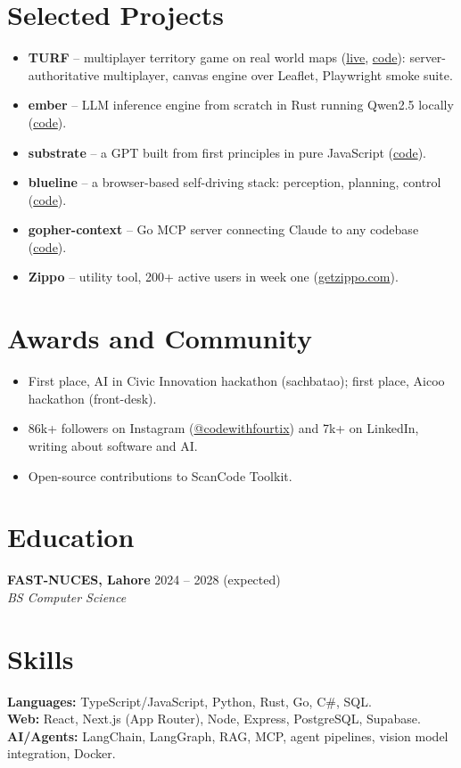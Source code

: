 \documentclass[10pt]{article}
\newcommand{\entry}[4]{\noindent\textbf{#1} \hfill #2\\ \textit{#3} \hfill #4\par}
\begin{document}
\section{Selected Projects}

\begin{itemize}
  \item \textbf{TURF} -- multiplayer territory game on real world maps
  (\href{https://turf-murex.vercel.app}{live},
  \href{https://github.com/codewithfourtix/turf}{code}): server-authoritative
  multiplayer, canvas engine over Leaflet, Playwright smoke suite.
  \item \textbf{ember} -- LLM inference engine from scratch in Rust running
  Qwen2.5 locally (\href{https://github.com/codewithfourtix/ember}{code}).
  \item \textbf{substrate} -- a GPT built from first principles in pure
  JavaScript (\href{https://github.com/codewithfourtix/substrate}{code}).
  \item \textbf{blueline} -- a browser-based self-driving stack: perception,
  planning, control (\href{https://github.com/codewithfourtix/blueline}{code}).
  \item \textbf{gopher-context} -- Go MCP server connecting Claude to any
  codebase (\href{https://github.com/codewithfourtix/gopher-context}{code}).
  \item \textbf{Zippo} -- utility tool, 200+ active users in week one
  (\href{https://getzippo.com}{getzippo.com}).
\end{itemize}

\section{Awards and Community}

\begin{itemize}
  \item First place, AI in Civic Innovation hackathon (sachbatao); first
  place, Aicoo hackathon (front-desk).
  \item 86k+ followers on Instagram
  (\href{https://www.instagram.com/codewithfourtix/}{@codewithfourtix}) and 7k+
  on LinkedIn, writing about software and AI.
  \item Open-source contributions to ScanCode Toolkit.
\end{itemize}

\section{Education}

\entry{FAST-NUCES, Lahore}{2024 -- 2028 (expected)}{BS Computer Science}{}

\section{Skills}

\noindent
\textbf{Languages:} TypeScript/JavaScript, Python, Rust, Go, C\#, SQL.\\
\textbf{Web:} React, Next.js (App Router), Node, Express, PostgreSQL, Supabase.\\
\textbf{AI/Agents:} LangChain, LangGraph, RAG, MCP, agent pipelines, vision
model integration, Docker.
\end{document}
